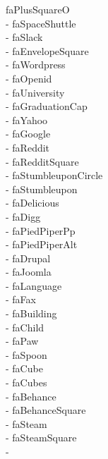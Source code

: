 \documentclass[%
               doublesided,
               paper=a4,
               fontsize=10pt
              ]{my-resume}
\begin{document}
faPlusSquareO\\ \faSpaceShuttle - faSpaceShuttle\\ \faSlack - faSlack\\ \faEnvelopeSquare - faEnvelopeSquare\\ \faWordpress - faWordpress\\ \faOpenid - faOpenid\\ \faUniversity - faUniversity\\ \faGraduationCap - faGraduationCap\\ \faYahoo - faYahoo\\ \faGoogle - faGoogle\\ \faReddit - faReddit\\ \faRedditSquare - faRedditSquare\\ \faStumbleuponCircle - faStumbleuponCircle\\ \faStumbleupon - faStumbleupon\\ \faDelicious - faDelicious\\ \faDigg - faDigg\\ \faPiedPiperPp - faPiedPiperPp\\ \faPiedPiperAlt - faPiedPiperAlt\\ \faDrupal - faDrupal\\ \faJoomla - faJoomla\\ \faLanguage - faLanguage\\ \faFax - faFax\\ \faBuilding - faBuilding\\ \faChild - faChild\\ \faPaw - faPaw\\ \faSpoon - faSpoon\\ \faCube - faCube\\ \faCubes - faCubes\\ \faBehance - faBehance\\ \faBehanceSquare - faBehanceSquare\\ \faSteam - faSteam\\ \faSteamSquare - faSteamSquare\\ \faRecycle - 
\end{document}
